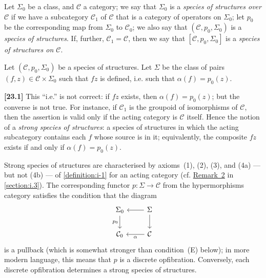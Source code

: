 \documentclass[a4paper,fleqn]{article}
\theoremstyle{plain}
\theoremstyle{definition}
\newenvironment{definition}[1]
  {\renewcommand\theinnerdefinition{#1}\innerdefinition}
  {\endinnerdefinition}
\newenvironment{longcomm}[1]
  {\noindent\textbf{[#1]}\rmfamily}
  {}
\newcommand{\CC}{\mathcal{C}}
\begin{document}
\begin{definition}{2}
\label{definition:i-2}
  Let $\Sigma_0$ be a class, and $\CC$ a category;
  we say that $\Sigma_0$ is a \emph{species of structures over $\CC$} if we have a subcategory $\CC_1$ of $\CC$ that is a category of operators on $\Sigma_0$;
  let $p_0$ be the corresponding map from $\Sigma_0$ to $\CC_0$;
  we also say that $(\CC,p_0,\Sigma_0)$ is a \emph{species of structures}.
  If, further, $\CC_1=\CC$, then we say that $[\CC,p_0,\Sigma_0]$ is a \emph{species of structures on $\CC$}.
\end{definition}

Let $(\CC,p_0,\Sigma_0)$ be a species of structures.
Let $\Sigma$ be the class of pairs $(f,z)\in\CC\times\Sigma_0$ such that $fz$ is defined, i.e. such that $\alpha(f)=p_0(z)$.

\begin{longcomm}{23.1}
  This ``i.e.'' is not correct: if $fz$ exists, then $\alpha(f)=p_0(z)$;
  but the converse is not true.
  For instance, if $\CC_1$ is the groupoid of isomorphisms of $\CC$, then the assertion is valid only if the acting category is $\CC$ itself.
  Hence the notion of a \emph{strong species of structures}: a species of structures in which the acting subcategory contains each $f$ whose source is in it;
  equivalently, the composite $fz$ exists if and only if $\alpha(f)=p_0(z)$.

  Strong species of structures are characterised by axioms~(1), (2), (3), and (4a) --- but not (4b) --- of \cref{definition:i-1} for an acting category (cf. \hyperref[remark:i-2]{Remark~2} in \cref{section:i.3}).
  The corresponding functor $p\colon\Sigma\to\CC$ from the hypermorphisms category satisfies the condition that the diagram
  \[
    \begin{tikzcd}
      \Sigma_0
        \ar[d,swap,"p_0"]
      & \Sigma
        \ar[l]
        \ar[d]
    \\\CC_0
      & \CC
        \ar[l,"\alpha"]
    \end{tikzcd}
  \]
  is a pullback (which is somewhat stronger than condition~(E) below);
  in more modern language, this means that $p$ is a discrete opfibration.
  Conversely, each discrete opfibration determines a strong species of structures.
\end{longcomm}
\end{document}
